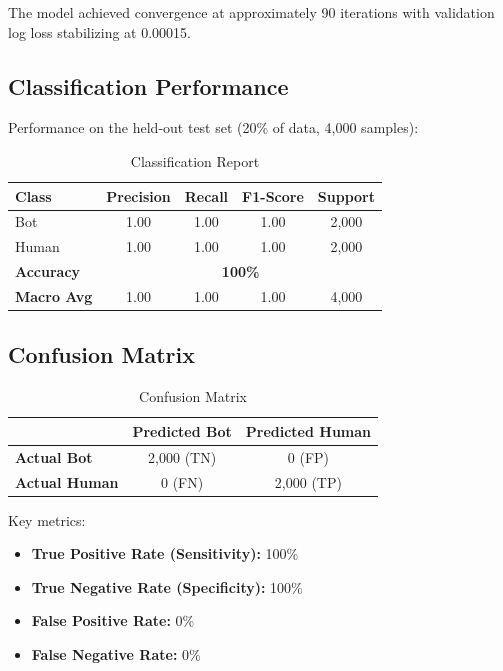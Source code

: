 The model achieved convergence at approximately 90 iterations with validation log loss stabilizing at 0.00015.

\subsection{Classification Performance}

Performance on the held-out test set (20\% of data, 4,000 samples):

\begin{table}[H]
\centering
\caption{Classification Report}
\label{tab:classification}
\begin{tabular}{|l|c|c|c|c|}
\hline
\textbf{Class} & \textbf{Precision} & \textbf{Recall} & \textbf{F1-Score} & \textbf{Support} \\
\hline
Bot & 1.00 & 1.00 & 1.00 & 2,000 \\
\hline
Human & 1.00 & 1.00 & 1.00 & 2,000 \\
\hline
\textbf{Accuracy} & \multicolumn{4}{c|}{\textbf{100\%}} \\
\hline
\textbf{Macro Avg} & 1.00 & 1.00 & 1.00 & 4,000 \\
\hline
\end{tabular}
\end{table}

\subsection{Confusion Matrix}

\begin{table}[H]
\centering
\caption{Confusion Matrix}
\label{tab:confusion}
\begin{tabular}{|l|c|c|}
\hline
& \textbf{Predicted Bot} & \textbf{Predicted Human} \\
\hline
\textbf{Actual Bot} & 2,000 (TN) & 0 (FP) \\
\hline
\textbf{Actual Human} & 0 (FN) & 2,000 (TP) \\
\hline
\end{tabular}
\end{table}

Key metrics:
\begin{itemize}
    \item \textbf{True Positive Rate (Sensitivity):} 100\%
    \item \textbf{True Negative Rate (Specificity):} 100\%
    \item \textbf{False Positive Rate:} 0\%
    \item \textbf{False Negative Rate:} 0\%
\end{itemize}

